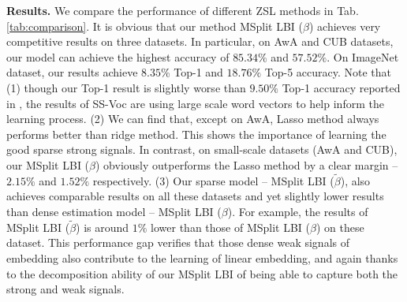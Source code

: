 \documentclass{article}
\begin{document}
\noindent \textbf{Results.} We compare the performance of different
ZSL methods in Tab. \ref{tab:comparison}. It is obvious that our
method MSplit LBI ($\beta$) achieves very competitive results on
three datasets. In particular, on AwA and CUB datasets, our model
can achieve the highest accuracy of $85.34\%$ and $57.52\%$. On
ImageNet dataset, our results achieve $8.35\%$ Top-1 and $18.76\%$
Top-5 accuracy. Note that (1) though our Top-1 result is slightly
worse than $9.50\%$ Top-1 accuracy reported in \citet{fu2016semi},
the results of SS-Voc are using large scale word vectors to help inform
the learning process. (2) We can find that, except on AwA, Lasso method
always performs better than ridge method. This shows the importance
of learning the good sparse strong signals. In contrast, on small-scale
datasets (AwA and CUB), our MSplit LBI ($\beta$) obviously outperforms
the Lasso method by a clear margin – $2.15\%$ and $1.52\%$ respectively.
(3) Our sparse model – MSplit LBI ($\tilde{\beta}$), also achieves
comparable results on all these datasets and yet slightly lower results
than dense estimation model – MSplit LBI (${\beta}$). For example,
the results of MSplit LBI ($\tilde{\beta}$) is around $1\%$ lower
than those of MSplit LBI (${\beta}$) on these dataset. This performance
gap verifies that those dense weak signals of embedding also contribute
to the learning of linear embedding, and again thanks to the decomposition
ability of our MSplit LBI of being able to capture both the strong
and weak signals.
\end{document}
